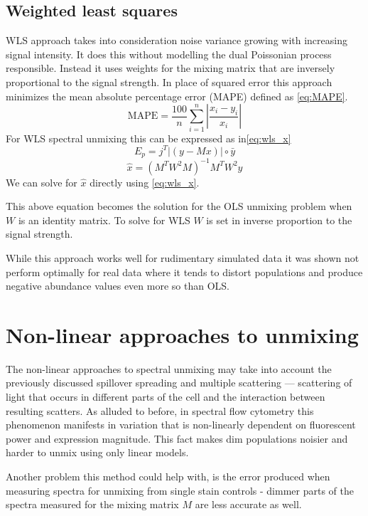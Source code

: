 \subsection{Weighted least squares}
WLS approach takes into consideration noise variance growing with increasing signal intensity. It does this without modelling the dual Poissonian process responsible. Instead it uses weights for the mixing matrix that are inversely proportional to the signal strength. In place of squared error this approach minimizes the mean absolute percentage error (MAPE) defined as \cref{eq:MAPE}.
\begin{equation}
\text{MAPE}=\frac{100}{n}\sum_{i=1}^{n}|\frac{x_i-y_i}{x_i}|
\label{eq:MAPE}
\end{equation}
For WLS spectral unmixing this can be expressed as in\cref{eq:wls_x}\cite{unmix2013nonsq} 
\begin{equation}
E_p=j^T|(y-Mx)|\circ\bar{y}
\label{eq:wls_x}
\end{equation}
\begin{equation}
\hat{x}=(M^TW^2M)^{-1}M^TW^2y
\label{eq:ols_x}
\end{equation}
We can solve for $\hat{x}$ directly using \cref{eq:wls_x}.

This above equation becomes the solution for the OLS unmixing problem when $W$ is an identity matrix. To solve for WLS $W$ is set in inverse proportion to the signal strength\cite{unmix2013nonsq}.

While this approach works well for rudimentary simulated data it was shown not perform optimally for real data where it tends to distort populations and produce negative abundance values even more so than OLS\cite{unmix2013nonsq}.


\section{Non-linear approaches to unmixing}

The non-linear approaches to spectral unmixing may take into account the previously discussed spillover spreading and multiple scattering --- scattering of light that occurs in different parts of the cell and the interaction between resulting scatters. As alluded to before, in spectral flow cytometry this phenomenon manifests in variation that is non-linearly dependent on fluorescent power and expression magnitude. This fact makes dim populations noisier and harder to unmix using only linear models.

Another problem this method could help with, is the error produced when measuring spectra for unmixing from single stain controls - dimmer parts of the spectra measured for the mixing matrix $M$ are less accurate as well.

